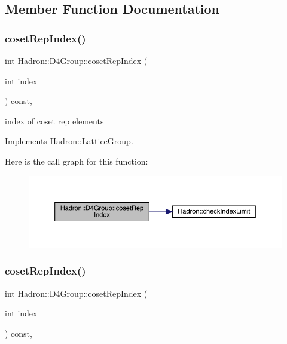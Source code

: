 \subsection{Member Function Documentation}
\mbox{\label{structHadron_1_1D4Group_ae7ebfa25f82987479c33f0d5d769ab2f}} 
\subsubsection{\texorpdfstring{cosetRepIndex()}{cosetRepIndex()}\hspace{0.1cm}{\footnotesize\ttfamily [1/3]}}
{\footnotesize\ttfamily int Hadron\+::\+D4\+Group\+::coset\+Rep\+Index (\begin{DoxyParamCaption}\item[{int}]{index }\end{DoxyParamCaption}) const\hspace{0.3cm}{\ttfamily [inline]}, {\ttfamily [virtual]}}

index of coset rep elements 

Implements \mbox{\hyperlink{structHadron_1_1LatticeGroup_a7e3b9b5e2f596e6c40d64aa939a3ad6c}{Hadron\+::\+Lattice\+Group}}.

Here is the call graph for this function\+:
\nopagebreak
\begin{figure}[H]
\begin{center}
\leavevmode
\includegraphics[width=350pt]{de/d5e/structHadron_1_1D4Group_ae7ebfa25f82987479c33f0d5d769ab2f_cgraph}
\end{center}
\end{figure}
\mbox{\label{structHadron_1_1D4Group_ae7ebfa25f82987479c33f0d5d769ab2f}} 
\subsubsection{\texorpdfstring{cosetRepIndex()}{cosetRepIndex()}\hspace{0.1cm}{\footnotesize\ttfamily [2/3]}}
{\footnotesize\ttfamily int Hadron\+::\+D4\+Group\+::coset\+Rep\+Index (\begin{DoxyParamCaption}\item[{int}]{index }\end{DoxyParamCaption}) const\hspace{0.3cm}{\ttfamily [inline]}, {\ttfamily [virtual]}}

